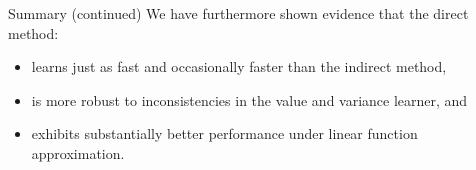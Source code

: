 \documentclass[10pt, compress]{beamer}
\begin{document}
\begin{frame}{Summary (continued)}
    We have furthermore shown evidence that the direct method:

    \begin{itemize}
        \item learns just as fast and occasionally \alert{faster} than the indirect method,
        \item is \alert{more robust} to inconsistencies in the value and variance learner, and
        \item exhibits substantially \alert{better} performance under linear function approximation.
    \end{itemize}
\end{frame}

\end{document}

